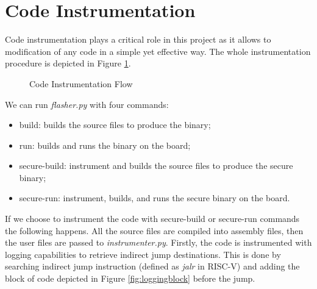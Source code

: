 \section{Code Instrumentation}
\label{sec:project_instrumentation}

Code instrumentation plays a critical role in this project as it allows to modification
of any code in a simple yet effective way. The whole instrumentation procedure
is depicted in Figure \ref{fig:instrumentation}.

\begin{figure}[htbp]
  \centering
  \def\stackalignment{r} %
  {\scriptsize }
  \caption{Code Instrumentation Flow}
  \label{fig:instrumentation}
\end{figure}

We can run \textit{flasher.py} with four commands:
\begin{itemize}[noitemsep]
  \item build: builds the source files to produce the binary;

  \item run: builds and runs the binary on the board;

  \item secure-build: instrument and builds the source files to produce the
    secure binary;

  \item secure-run: instrument, builds, and runs the secure binary on the board.
\end{itemize}

If we choose to instrument the code with secure-build or secure-run commands the
following happens. All the source files are compiled into assembly files, then
the user files are passed to \textit{instrumenter.py}. Firstly, the code is instrumented
with logging capabilities to retrieve indirect jump destinations. This is done
by searching indirect jump instruction (defined as \textit{jalr} in RISC-V) and adding
the block of code depicted in Figure \ref{fig:loggingblock} before the jump.

